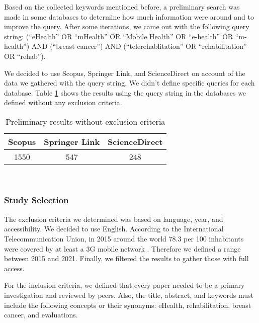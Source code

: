 \documentclass[conference]{IEEEtran}
\begin{document}
Based on the collected keywords mentioned before, a preliminary search was made in some databases to determine how much information were around and to improve the query. After some iterations, we came out with the following query string: (``eHealth'' OR ``mHealth'' OR ``Mobile Health'' OR ``e-health'' OR ``m-health'') AND (``breast cancer'') AND (``telerehablitation'' OR ``rehabilitation'' OR ``rehab'').

We decided to use Scopus, Springer Link, and ScienceDirect on account of the data we gathered with the query string. We didn't define specific queries for each database. Table \ref{table:preliminary_results} shows the results using the query string in the databases we defined without any exclusion criteria.

\begin{table}[h!]
\centering
\begin{tabular}{||c c c||} 
 \hline
 Scopus & Springer Link & ScienceDirect \\
 \hline\hline
 1550 & 547 & 248 \\ 
 \hline
\end{tabular} \\ [1ex] 
\caption{Preliminary results without exclusion criteria}
\label{table:preliminary_results}
\end{table}

\subsubsection{Study Selection}
The exclusion criteria we determined was based on language, year, and accessibility.  We decided to use English. According to the International Telecommunication Union, in 2015 around the world 78.3 per 100 inhabitants were covered by at least a 3G mobile network \cite{ITU}. Therefore we defined a range between 2015 and 2021. Finally, we filtered the results to gather those with full access.

For the inclusion criteria, we defined that every paper needed to be a primary investigation and reviewed by peers. Also, the title, abstract, and keywords must include the following concepts or their synonyms: eHealth, rehabilitation, breast cancer, and evaluations.

\end{document}
